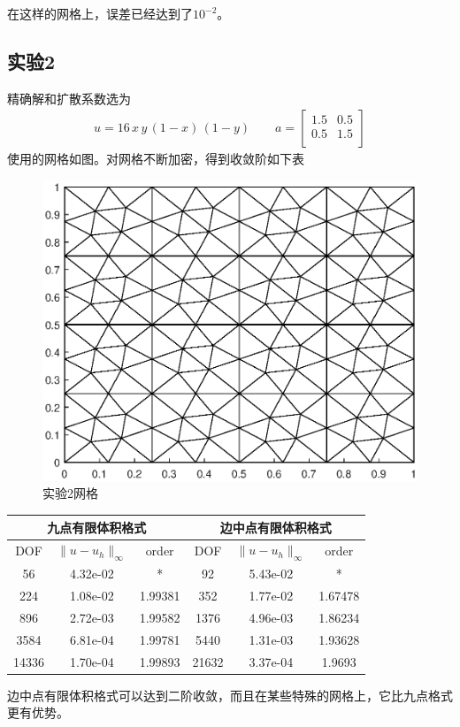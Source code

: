 \documentclass[12pt,a4paper]{article}
\theoremstyle{plain}
\begin{document}
在这样的网格上，误差已经达到了$10^{-2}$。

\subsection*{实验2}

精确解和扩散系数选为
\begin{align*}
u = 16 \, x \, y \, (1-x) \, (1-y) \qquad
a = \left[
\begin{matrix}
1.5 & 0.5 \\
0.5 & 1.5 \\
\end{matrix}
\right]
\end{align*}
使用的网格如图。对网格不断加密，得到收敛阶如下表
\begin{figure}[H]
\centering
\includegraphics[width=0.4\linewidth]{mesh2}
\caption{实验2网格}
\end{figure}

\begin{table}
\centering
\begin{tabular}{ccc|ccc}
\multicolumn{3}{c}{九点有限体积格式}  & \multicolumn{3}{c}{边中点有限体积格式} \\
\hline
DOF & $\|u - u_h\|_{\infty}$ & order & DOF & $\|u - u_h\|_{\infty}$ & order \\
\hline
56 & 4.32e-02 & * & 92 & 5.43e-02 & * \\
224 & 1.08e-02 & 1.99381 & 352 & 1.77e-02 & 1.67478 \\
896 & 2.72e-03 & 1.99582 & 1376 & 4.96e-03 & 1.86234 \\
3584 & 6.81e-04 & 1.99781 & 5440 & 1.31e-03 & 1.93628 \\
14336 & 1.70e-04 & 1.99893 & 21632 & 3.37e-04 & 1.9693 \\
\hline
\end{tabular}
\end{table}

边中点有限体积格式可以达到二阶收敛，而且在某些特殊的网格上，它比九点格式更有优势。

%
%
\end{document}
